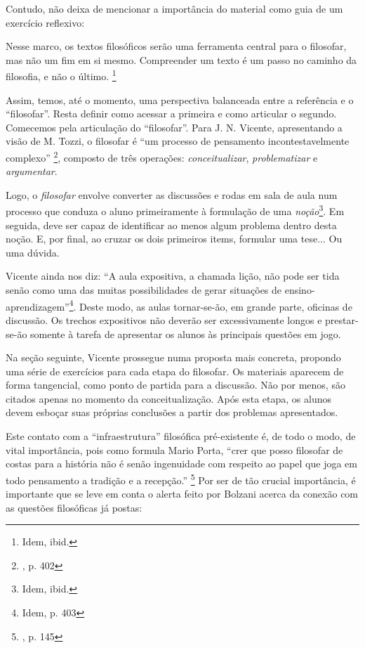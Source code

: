 \documentclass[12pt,a4paper]{article}
\newenvironment{citac}{
	\begin{addmargin}[4cm]{1em} \footnotesize}{\normalfont \end{addmargin}
}
\begin{document}
	Contudo, não deixa de mencionar a importância do material como 
	guia de um exercício reflexivo: 
	
	\begin{citac}
		Nesse marco, os textos filosóficos serão uma ferramenta 
		central para o filosofar, mas não um fim em si mesmo. 
		Compreender um texto é um passo no caminho da filosofia, 
		e não o último. 
		\footnote{Idem, ibid.}
	\end{citac}

	Assim, temos, até o momento, uma perspectiva balanceada entre 
	a referência e o “filosofar”. Resta definir como acessar a 
	primeira e como articular o segundo. Comecemos pela articulação 
	do “filosofar”. Para J. N. Vicente, apresentando a visão de M. Tozzi, 
	o filosofar é “um processo de pensamento incontestavelmente complexo”
	\footnote{\cite{neves}, p. 402}, composto de três operações: 
	\emph{conceitualizar}, \emph{problematizar} e \emph{argumentar}. 

	Logo, o \emph{filosofar} envolve converter as discussões e rodas 
	em sala de aula num processo que conduza o aluno primeiramente 
	à formulação de uma \emph{noção}\footnote{Idem, ibid.}. 
	Em seguida, deve ser capaz de identificar ao menos algum problema 
	dentro desta noção. E, por final, ao cruzar os dois primeiros 
	items, formular uma tese... Ou uma dúvida. 

	Vicente ainda nos diz: “A aula expositiva, a chamada lição, não 
	pode ser tida senão como uma das muitas possibilidades de gerar 
	situações de ensino-aprendizagem”\footnote{Idem, p. 403}. 
	Deste modo, as aulas tornar-se-ão, em grande parte, oficinas de 
	discussão. Os trechos expositivos não deverão ser excessivamente 
	longos e prestar-se-ão somente à tarefa de apresentar os alunos 
	às principais questões em jogo. 

	Na seção seguinte, Vicente prossegue numa proposta mais concreta, 
	propondo uma série de exercícios para cada etapa do filosofar. Os 
	materiais aparecem de forma tangencial, como ponto de partida para 
	a discussão. Não por menos, são citados apenas no momento da 
	conceitualização. Após esta etapa, os alunos devem esboçar suas 
	próprias conclusões a partir dos problemas apresentados.  

	Este contato com a “infraestrutura” filosófica pré-existente é, 
	de todo o modo, de vital importância, pois
	como formula Mario Porta, “crer que posso 
	filosofar de costas para a história não é senão ingenuidade
	com respeito ao papel que joga em todo pensamento a tradição 
	e a recepção.” \footnote{\cite{porta}, p. 145}
	Por ser de tão crucial importância, é importante 
	que se leve em conta o alerta feito por Bolzani acerca da 
	conexão com as questões filosóficas já postas: 
\end{document}
